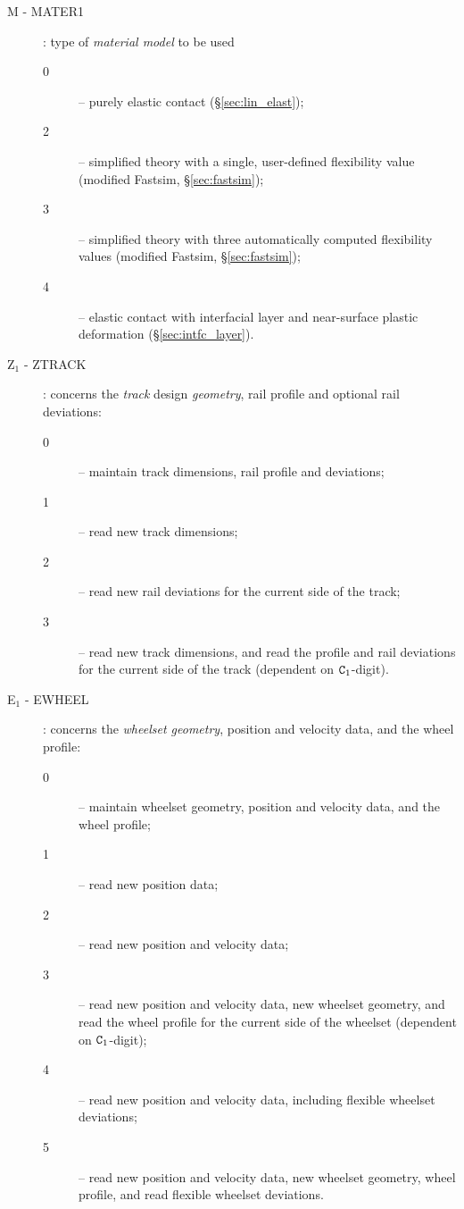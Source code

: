 \documentclass[12pt]{report}
\renewcommand{\magenta}[1]{}
\begin{document}
\begin{description}
\item[M - MATER1] \label{m-digit} : type of {\em material model\/} to
        be used
\begin{description}
\item[0] -- purely elastic contact (\S \ref{sec:lin_elast});
\magenta{
\item[1] -- viscoelastic contact (\S \ref{sec:visc_elast});
}
\item[2] -- simplified theory with a single, user-defined flexibility value
        (modified Fastsim, \S \ref{sec:fastsim});
\item[3] -- simplified theory with three automatically computed flexibility
        values (modified Fastsim, \S \ref{sec:fastsim});
\item[4] -- elastic contact with interfacial layer and near-surface plastic
        deformation (\S \ref{sec:intfc_layer}).
\magenta{
\item[5] -- reserved for pseudo-viscous damping;
\item[6] -- reserved for two quarter-spaces with vertical gap in between.
}
\end{description}

\item[Z$_1$ - ZTRACK] \label{z1-digit}: concerns the {\em track\/} design {\em
        geometry\/}, rail profile and optional rail deviations:
\begin{description}
\item[0] -- maintain track dimensions, rail profile and deviations;
\item[1] -- read new track dimensions;
\item[2] -- read new rail deviations for the current side of the track;
\item[3] -- read new track dimensions, and read the profile and rail
        deviations for the current side of the track (dependent on 
        ${\tt C}_1$-digit).
\end{description}

\item[E$_1$ - EWHEEL] \label{e1-digit} : concerns the {\em wheelset
        geometry\/}, position and velocity data, and the wheel profile:
\begin{description}
\item[0] -- maintain wheelset geometry, position and velocity data, and the
        wheel profile;
\item[1] -- read new position data;
\item[2] -- read new position and velocity data;
\item[3] -- read new position and velocity data, new wheelset geometry,
        and read the wheel profile for the current side of the wheelset
        (dependent on ${\tt C}_1$-digit);
\item[4] -- read new position and velocity data, including flexible
        wheelset deviations;
\item[5] -- read new position and velocity data, new wheelset geometry,
        wheel profile, and read flexible wheelset deviations.
\end{description}


\end{description}
\end{document}

